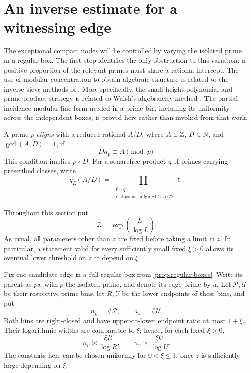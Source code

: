 \section{An inverse estimate for a witnessing edge}
\label{sec:inverse}

The exceptional compact nodes will be controlled by varying the isolated
prime in a regular box.  The first step identifies the only obstruction
to this variation: a positive proportion of the relevant primes must
share a rational intercept. The use of modular concentration to obtain
algebraic structure is related to the inverse-sieve methods of
\cite{HelfgottVenkatesh2009,Walsh2012}. More specifically, the
small-height polynomial and prime-product strategy is related to Walsh's
algebraicity method \cite[Section~3]{Walsh2014}. The partial-incidence
modular-line form needed in a prime bin, including its uniformity across
the independent boxes, is proved here rather than invoked from that work.

\begin{definition}
A prime \(p\) \emph{aligns} with a reduced rational \(A/D\), where
\(A\in\mathbb Z\), \(D\in\mathbb N\), and \(\gcd(A,D)=1\), if
\[
  D a_p\equiv A\pmod p.
\]
This condition implies \(p\nmid D\).
For a squarefree product \(q\) of primes carrying prescribed classes,
write
\[
 q_E(A/D)=
 \prod_{\substack{\ell\mid q\\
                   \ell\text{ does not align with }A/D}}\ell .
\]
\end{definition}

Throughout this section put
\begin{equation}
 \mathcal Z=\exp\!\left(\frac{L}{\log L}\right).
 \label{eq:inverse-z}
\end{equation}
As usual, all parameters other than \(z\) are fixed before taking a limit
in \(z\).  In particular, a statement valid for every sufficiently small
fixed \(\xi>0\) allows its eventual lower threshold on \(z\) to depend on
\(\xi\).

Fix one candidate edge in a full regular box from
\cref{prop:regular-boxes}.  Write its parent as \(p q\), with \(p\) the
isolated prime, and denote its edge prime by \(u\).  Let
\(\mathcal P,\mathcal U\) be their respective prime bins, let \(R,U\) be
the lower endpoints of these bins, and put
\[
 n_p=\#\mathcal P,\qquad n_u=\#\mathcal U.
\]
Both bins are right-closed and have upper-to-lower endpoint ratio at most
\(1+\xi\).  Their logarithmic widths are comparable to \(\xi\); hence,
for each fixed \(\xi>0\),
\begin{equation}
 n_p\asymp \frac{\xi R}{\log R},
 \qquad
 n_u\asymp \frac{\xi U}{\log U}.
 \label{eq:inverse-bin-counts}
\end{equation}
The constants here can be chosen uniformly for \(0<\xi\le1\), once \(z\)
is sufficiently large depending on \(\xi\).


